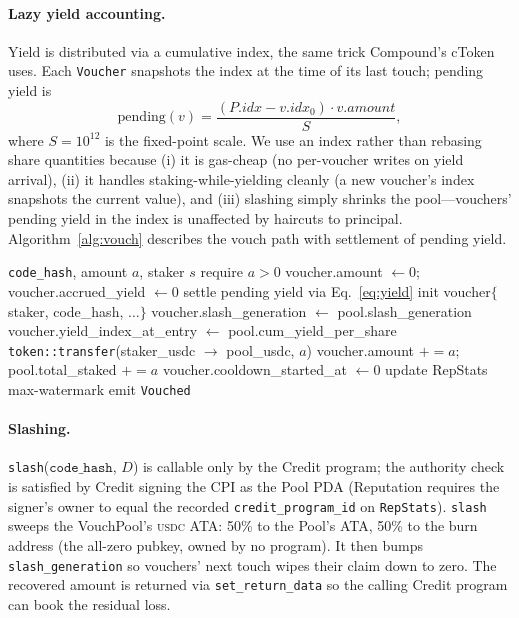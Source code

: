 \documentclass[10pt,conference,letterpaper]{IEEEtran}
\theoremstyle{definition}
\newcommand{\codehash}{\texttt{code\_hash}}
\newcommand{\USDC}{\textsc{usdc}}
\begin{document}
\paragraph{Lazy yield accounting.} Yield is distributed via a
cumulative index, the same trick Compound's cToken uses. Each
\texttt{Voucher} snapshots the index at the time of its last touch;
pending yield is
\begin{equation}
\mathrm{pending}(v) = \frac{(P.\mathit{idx} - v.\mathit{idx}_0)\cdot v.\mathit{amount}}{S},
\label{eq:yield}
\end{equation}
where $S = 10^{12}$ is the fixed-point scale. We use an index rather
than rebasing share quantities because (i) it is gas-cheap (no
per-voucher writes on yield arrival), (ii) it handles
staking-while-yielding cleanly (a new voucher's index snapshots the
current value), and (iii) slashing simply shrinks the pool---vouchers'
pending yield in the index is unaffected by haircuts to principal.
Algorithm~\ref{alg:vouch} describes the vouch path with settlement of
pending yield.

\begin{algorithm}[t]
\caption{\texttt{vouch} with lazy settlement and slash generation.}
\label{alg:vouch}
\begin{algorithmic}[1]
\Require \codehash, amount $a$, staker $s$
\State require $a > 0$
  \State voucher.amount $\gets 0$; voucher.accrued\_yield $\gets 0$
\EndIf
{}
  \State settle pending yield via Eq.~\ref{eq:yield}
\Else
  \State init voucher$\{$staker, code\_hash, $\ldots\}$
\EndIf
\State voucher.slash\_generation $\gets$ pool.slash\_generation
\State voucher.yield\_index\_at\_entry $\gets$ pool.cum\_yield\_per\_share
\State \texttt{token::transfer}(staker\_usdc $\to$ pool\_usdc, $a$)
\State voucher.amount $\mathrel{+}= a$;
  pool.total\_staked $\mathrel{+}= a$
\State voucher.cooldown\_started\_at $\gets 0$
\State update RepStats max-watermark
\State emit \texttt{Vouched}
\end{algorithmic}
\end{algorithm}

\paragraph{Slashing.}
\texttt{slash}($\codehash$, $D$) is callable only by the Credit
program; the authority check is satisfied by Credit signing the CPI
as the Pool PDA (Reputation requires the signer's owner to equal the
recorded \texttt{credit\_program\_id} on \texttt{RepStats}).
\texttt{slash} sweeps the VouchPool's \USDC{} ATA: 50\% to the Pool's
ATA, 50\% to the burn address (the all-zero pubkey, owned by no
program). It then bumps \texttt{slash\_generation} so vouchers' next
touch wipes their claim down to zero. The recovered amount is returned
via \texttt{set\_return\_data} so the calling Credit program can book
the residual loss.
\end{document}
